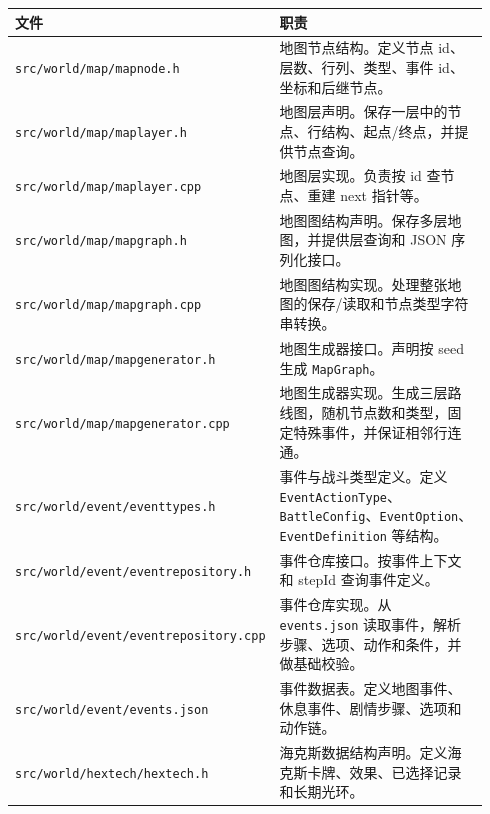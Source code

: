 \documentclass[UTF8,10pt]{ctexart}
\begin{document}
{\small
\begin{longtable}{p{0.34\linewidth}p{0.60\linewidth}}
\toprule
\textbf{文件} & \textbf{职责} \\
\midrule
\texttt{src/\allowbreak{}world/\allowbreak{}map/\allowbreak{}mapnode.\allowbreak{}h} & 地图节点结构。定义节点 id、层数、行列、类型、事件 id、坐标和后继节点。 \\
\texttt{src/\allowbreak{}world/\allowbreak{}map/\allowbreak{}maplayer.\allowbreak{}h} & 地图层声明。保存一层中的节点、行结构、起点/终点，并提供节点查询。 \\
\texttt{src/\allowbreak{}world/\allowbreak{}map/\allowbreak{}maplayer.\allowbreak{}cpp} & 地图层实现。负责按 id 查节点、重建 next 指针等。 \\
\texttt{src/\allowbreak{}world/\allowbreak{}map/\allowbreak{}mapgraph.\allowbreak{}h} & 地图图结构声明。保存多层地图，并提供层查询和 JSON 序列化接口。 \\
\texttt{src/\allowbreak{}world/\allowbreak{}map/\allowbreak{}mapgraph.\allowbreak{}cpp} & 地图图结构实现。处理整张地图的保存/读取和节点类型字符串转换。 \\
\texttt{src/\allowbreak{}world/\allowbreak{}map/\allowbreak{}mapgenerator.\allowbreak{}h} & 地图生成器接口。声明按 seed 生成 \texttt{MapGraph}。 \\
\texttt{src/\allowbreak{}world/\allowbreak{}map/\allowbreak{}mapgenerator.\allowbreak{}cpp} & 地图生成器实现。生成三层路线图，随机节点数和类型，固定特殊事件，并保证相邻行连通。 \\
\texttt{src/\allowbreak{}world/\allowbreak{}event/\allowbreak{}eventtypes.\allowbreak{}h} & 事件与战斗类型定义。定义 \texttt{EventActionType}、\texttt{BattleConfig}、\texttt{EventOption}、\texttt{EventDefinition} 等结构。 \\
\texttt{src/\allowbreak{}world/\allowbreak{}event/\allowbreak{}eventrepository.\allowbreak{}h} & 事件仓库接口。按事件上下文和 stepId 查询事件定义。 \\
\texttt{src/\allowbreak{}world/\allowbreak{}event/\allowbreak{}eventrepository.\allowbreak{}cpp} & 事件仓库实现。从 \texttt{events.\allowbreak{}json} 读取事件，解析步骤、选项、动作和条件，并做基础校验。 \\
\texttt{src/\allowbreak{}world/\allowbreak{}event/\allowbreak{}events.\allowbreak{}json} & 事件数据表。定义地图事件、休息事件、剧情步骤、选项和动作链。 \\
\texttt{src/\allowbreak{}world/\allowbreak{}hextech/\allowbreak{}hextech.\allowbreak{}h} & 海克斯数据结构声明。定义海克斯卡牌、效果、已选择记录和长期光环。 \\

\end{longtable}}
\end{document}
